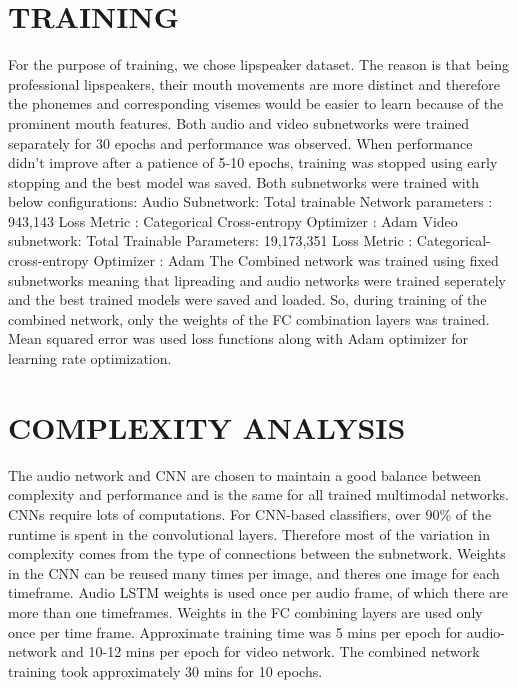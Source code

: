 \documentclass{article}
\begin{document}
\section{TRAINING}
For the purpose of training, we chose lipspeaker dataset. The reason is that being professional lipspeakers, their mouth movements are more distinct and therefore the phonemes and corresponding visemes would be easier to learn because of the prominent mouth features.
Both audio and video subnetworks were trained separately for 30 epochs and performance was observed. When performance didn't improve after a patience of 5-10 epochs, training was stopped using early stopping and the best model was saved.
\newline
Both subnetworks were trained with below configurations:
\newline
\newline
Audio Subnetwork:\newline
Total trainable Network parameters \cite{LSTMParams}: 943,143 \newline
Loss Metric : Categorical Cross-entropy \newline
Optimizer : Adam \newline
\newline
Video subnetwork:\newline
Total Trainable Parameters:\cite{CNNFeatures} 19,173,351 \newline
Loss Metric : Categorical-cross-entropy \newline
Optimizer : Adam \newline
\newline
The Combined network was trained using fixed subnetworks meaning that lipreading and audio networks were trained seperately and the best trained models were saved and loaded. So, during training of the combined network, only the weights of the FC combination layers was trained.
Mean squared error was used loss functions along with Adam optimizer for learning rate optimization.

\section{COMPLEXITY ANALYSIS} 
The audio network and CNN are chosen to maintain a good balance between complexity and performance and is the same for all trained multimodal networks. CNNs require lots of computations. For CNN-based classifiers, over 90\% of the runtime is spent in the convolutional layers. Therefore most of the variation in complexity comes from the type of connections between the subnetwork. Weights in the CNN can be reused many times per image, and there\’s one image for each timeframe. Audio LSTM weights is used once per audio frame, of which there are more than one timeframes. Weights in the FC combining layers are used only once per time frame.  
Approximate training time was 5 mins per epoch for audio-network and 10-12 mins per epoch for video network. The combined network training took approximately 30 mins for 10 epochs.
\end{document}
